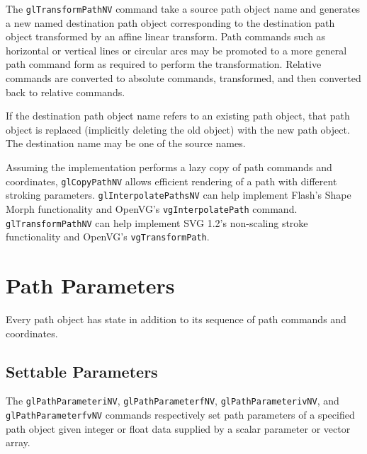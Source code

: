 The {\tt glTransformPathNV} command take a source path object name and
generates a new named destination path object corresponding to the
destination path object transformed by an affine linear transform.
Path commands such as horizontal or vertical lines or circular arcs may
be promoted to a more general path command form as required to perform
the transformation.  Relative commands are converted to absolute commands,
transformed, and then converted back to relative commands.

If the destination path object name refers to an existing path object,
that path object is replaced (implicitly deleting the old object) with the
new path object.  The destination name may be one of the source names.

Assuming the implementation performs a lazy copy of path commands and
coordinates, {\tt glCopyPathNV} allows efficient rendering of a path with
different stroking parameters.  {\tt glInterpolatePathsNV} can help implement
Flash's Shape Morph functionality and OpenVG's {\tt vgInterpolatePath}
command.  {\tt glTransformPathNV} can help implement SVG 1.2's non-scaling
stroke functionality and OpenVG's {\tt vgTransformPath}. 

\section{Path Parameters}
\label{api:parameters}

Every path object has state in addition to its sequence of path commands
and coordinates.

\subsection{Settable Parameters}

The {\tt glPathParameteriNV}, {\tt glPathParameterfNV}, {\tt glPathParameterivNV},
and {\tt glPathParameterfvNV} commands respectively set path parameters of
a specified path object given integer or float data supplied by a scalar
parameter or vector array.

